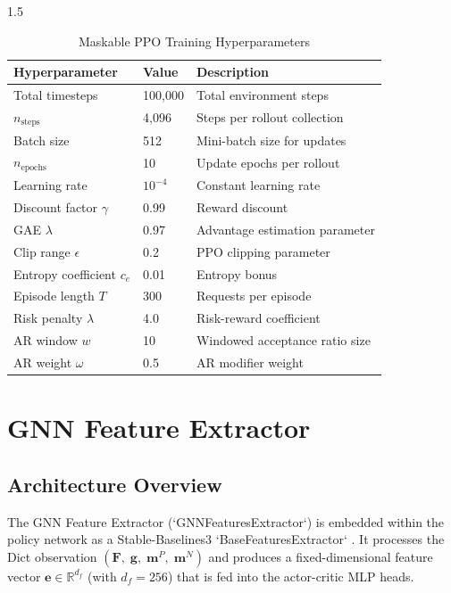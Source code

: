 \documentclass[A4paper,12pt]{report}
\theoremstyle{plain}
\theoremstyle{definition}
\theoremstyle{remark}
\numberwithin{equation}{section}
\begin{document}
\begin{spacing}{1.5}
\begin{table}[!ht]
\centering
\caption{Maskable PPO Training Hyperparameters}
\label{tab:training}
\begin{tabularx}{\textwidth}{X X X}
\hline
\textbf{Hyperparameter} & \textbf{Value} & \textbf{Description} \\ \hline
Total timesteps & 100,000 & Total environment steps \\
$n_{\text{steps}}$ & 4,096 & Steps per rollout collection \\
Batch size & 512 & Mini-batch size for updates \\
$n_{\text{epochs}}$ & 10 & Update epochs per rollout \\
Learning rate & $10^{-4}$ & Constant learning rate \\
Discount factor $\gamma$ & 0.99 & Reward discount \\
GAE $\lambda$ & 0.97 & Advantage estimation parameter \\
Clip range $\epsilon$ & 0.2 & PPO clipping parameter \\
Entropy coefficient $c_e$ & 0.01 & Entropy bonus \\
Episode length $T$ & 300 & Requests per episode \\
Risk penalty $\lambda$ & 4.0 & Risk-reward coefficient \\
AR window $w$ & 10 & Windowed acceptance ratio size \\
AR weight $\omega$ & 0.5 & AR modifier weight \\
\hline
\end{tabularx}
\end{table}

\section{GNN Feature Extractor}

\subsection{Architecture Overview}

The GNN Feature Extractor (`GNNFeaturesExtractor`) is embedded within the policy network as a Stable-Baselines3 `BaseFeaturesExtractor` \cite{raffin2021}. It processes the Dict observation $({\mathbf{F}},\; \mathbf{g},\; \mathbf{m}^P,\; \mathbf{m}^N)$ and produces a fixed-dimensional feature vector $\mathbf{e} \in \mathbb{R}^{d_f}$ (with $d_f = 256$) that is fed into the actor-critic MLP heads.


\end{spacing}
\end{document}
